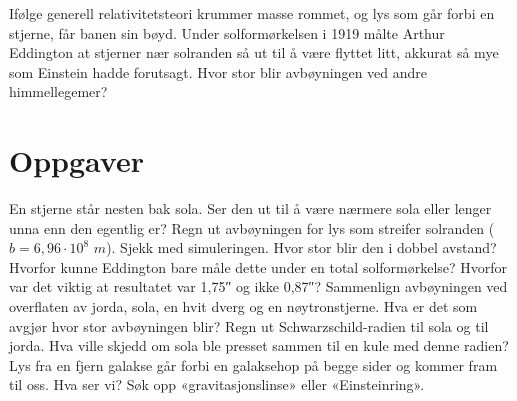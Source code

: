 \documentclass[11pt]{article}
\begin{document}

Ifølge generell relativitetsteori krummer masse rommet, og lys som går forbi en stjerne, får banen sin bøyd. Under solformørkelsen i 1919 målte Arthur Eddington at stjerner nær solranden så ut til å være flyttet litt, akkurat så mye som Einstein hadde forutsagt. Hvor stor blir avbøyningen ved andre himmellegemer?

\section*{Oppgaver}

\begin{oppgaveliste}
\oppgave {}En stjerne står nesten bak sola. Ser den ut til å være nærmere sola eller lenger unna enn den egentlig er?
\svar
\oppgave {}Regn ut avbøyningen for lys som streifer solranden ($b = 6{,}96 \cdot 10^{8}$ $m$). Sjekk med simuleringen. Hvor stor blir den i dobbel avstand?
\svar
\oppgave {}Hvorfor kunne Eddington bare måle dette under en total solformørkelse? Hvorfor var det viktig at resultatet var 1,75″ og ikke 0,87″?
\svar
\oppgave {}Sammenlign avbøyningen ved overflaten av jorda, sola, en hvit dverg og en nøytronstjerne. Hva er det som avgjør hvor stor avbøyningen blir?
\svar
\oppgave {}Regn ut Schwarzschild-radien til sola og til jorda. Hva ville skjedd om sola ble presset sammen til en kule med denne radien?
\svar
\oppgave {}Lys fra en fjern galakse går forbi en galaksehop på begge sider og kommer fram til oss. Hva ser vi? Søk opp «gravitasjonslinse» eller «Einsteinring».
\svar
\end{oppgaveliste}
\end{document}
